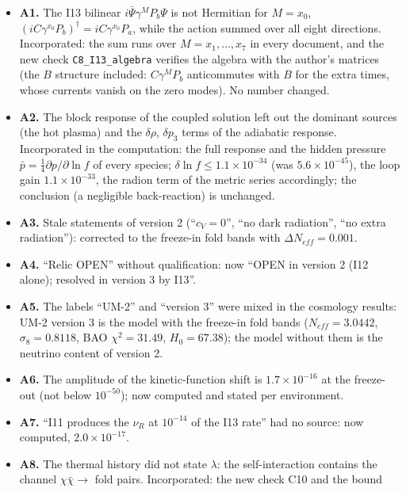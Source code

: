 \documentclass[
  10pt,
]{article}
\providecommand{\tightlist}{%
  \setlength{\itemsep}{0pt}\setlength{\parskip}{0pt}}
\begin{document}
\begin{itemize}
\tightlist
\item
  \textbf{A1.} The I13 bilinear \(i\bar\Psi\gamma^MP_b\Psi\) is not
  Hermitian for \(M = x_0\),
  \((iC\gamma^{x_0}P_b)^\dagger = iC\gamma^{x_0}P_a\), while the action
  summed over all eight directions. Incorporated: the sum runs over
  \(M = x_1, \dots, x_7\) in every document, and the new check
  \texttt{C8\_I13\_algebra} verifies the algebra with the author's
  matrices (the \(B\) structure included: \(C\gamma^MP_b\) anticommutes
  with \(B\) for the extra times, whose currents vanish on the zero
  modes). No number changed.
\item
  \textbf{A2.} The block response of the coupled solution left out the
  dominant sources (the hot plasma) and the \(\delta\rho\),
  \(\delta p_3\) terms of the adiabatic response. Incorporated in the
  computation: the full response and the hidden pressure
  \(\bar p = \frac14\partial p/\partial\ln f\) of every species;
  \(\delta\ln f \le 1.1\times10^{-34}\) (was \(5.6\times10^{-45}\)), the
  loop gain \(1.1\times10^{-33}\), the radion term of the metric series
  accordingly; the conclusion (a negligible back-reaction) is unchanged.
\item
  \textbf{A3.} Stale statements of version 2 (``\(c_V = 0\)'', ``no dark
  radiation'', ``no extra radiation''): corrected to the freeze-in fold
  bands with \(\Delta N_{eff} = 0.001\).
\item
  \textbf{A4.} ``Relic OPEN'' without qualification: now ``OPEN in
  version 2 (I12 alone); resolved in version 3 by I13''.
\item
  \textbf{A5.} The labels ``UM-2'' and ``version 3'' were mixed in the
  cosmology results: UM-2 version 3 is the model with the freeze-in fold
  bands (\(N_{eff} = 3.0442\), \(\sigma_8 = 0.8118\), BAO
  \(\chi^2 = 31.49\), \(H_0 = 67.38\)); the model without them is the
  neutrino content of version 2.
\item
  \textbf{A6.} The amplitude of the kinetic-function shift is
  \(1.7\times10^{-16}\) at the freeze-out (not below \(10^{-50}\)); now
  computed and stated per environment.
\item
  \textbf{A7.} ``I11 produces the \(\nu_R\) at \(10^{-14}\) of the I13
  rate'' had no source: now computed, \(2.0\times10^{-17}\).
\item
  \textbf{A8.} The thermal history did not state \(\lambda\): the
  self-interaction contains the channel \(\chi\bar\chi \to\) fold pairs.
  Incorporated: the new check C10 and the bound

\end{itemize}
\end{document}
